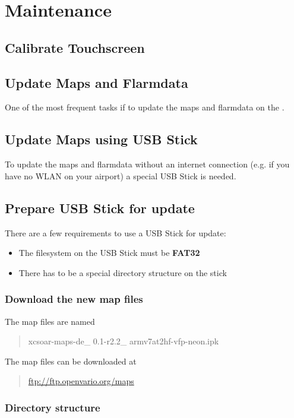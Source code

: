 \chapter{Maintenance}\label{cha:maintenance}

\section{Calibrate Touchscreen}

\section{Update Maps and Flarmdata}
One of the most frequent tasks if to update the maps and flarmdata on the \ovfc.

\section{Update Maps using USB Stick}\label{cha:upd_maps_usb}
To update the maps and flarmdata without an internet connection (e.g. if you have no 
WLAN on your airport) a special USB Stick is needed.

\section{Prepare USB Stick for update}
There are a few requirements to use a USB Stick for update:
\begin{itemize}
\item The filesystem on the USB Stick must be \textbf{FAT32}
\item There has to be a special directory structure on the stick
\end{itemize}

\subsection{Download the new map files}
The map files are named 
\begin{quote}
	xcsoar-maps-de\_ 0.1-r2.2\_ armv7at2hf-vfp-neon.ipk
\end{quote}

The map files can be downloaded at 
\begin{quote}
\url{ftp://ftp.openvario.org/maps}
\end{quote}

\subsection{Directory structure}


